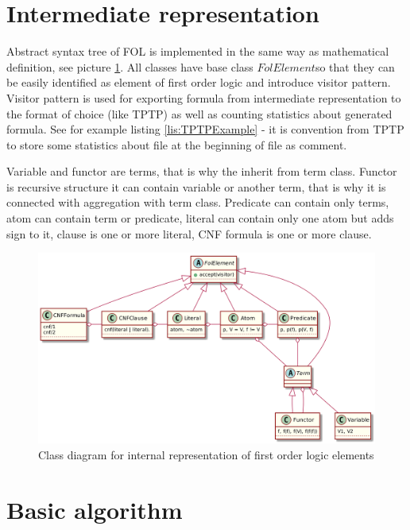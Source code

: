\section{Intermediate representation}

Abstract syntax tree of \gls{FOL} is implemented in the same way as mathematical definition, see picture \ref{pic:fol_elements_class_diagram}. All classes have base class $FolElement$so that they can be easily identified as element of first order logic and introduce visitor pattern. Visitor pattern is used for exporting formula from intermediate representation to the format of choice (like \gls{TPTP}) as well as counting statistics about generated formula. See for example listing \ref{lis:TPTPExample} - it is convention from TPTP to store some statistics about file at the beginning of file as comment.

Variable and functor are terms, that is why the inherit from term class. Functor is recursive structure it can contain variable or another term, that is why it is connected with aggregation with term class. Predicate can contain only terms, atom can contain term or predicate, literal can contain only one atom but adds sign to it, clause is one or more literal, CNF formula is one or more clause.

\begin{figure}[h]
\begin{centering}
  \includegraphics[width=\textwidth]{logic-formula-generator/fol/cnf_fol_elements.png}
  \caption{Class diagram for internal representation of first order logic elements}
  \label{pic:fol_elements_class_diagram}
\end{centering}
\end{figure}
\section{Basic algorithm}

